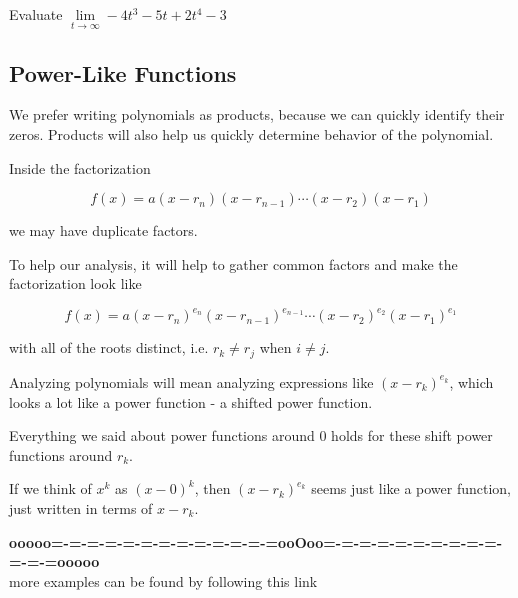 \documentclass{ximera}
\begin{document}
\begin{question}

Evaluate $\lim\limits_{t \to \infty} -4 t^3 - 5 t + 2 t^4  - 3$


\begin{multipleChoice}
\choice [correct]{$-\infty$}
\choice {$\infty$}
\end{multipleChoice}

\end{question}










\subsection{Power-Like Functions}

We prefer writing polynomials as products, because we can quickly identify their zeros.  Products will also help us quickly determine behavior of the polynomial.

Inside the factorization

\[   f(x) = a (x-r_n)(x-r_{n-1})  \cdots (x-r_2)(x-r_1)  \]

we may have duplicate factors.

To help our analysis, it will help to gather common factors and make the factorization look like

\[   f(x) = a (x-r_n)^{e_n}(x-r_{n-1})^{e_{n-1}}  \cdots (x-r_2)^{e_2}(x-r_1)^{e_1}  \]

with all of the roots distinct, i.e. $r_k \ne r_j$ when $i \ne j$.



Analyzing polynomials will mean analyzing expressions like $(x-r_k)^{e_k}$, which looks a lot like a power function - a shifted power function.

Everything we said about power functions around $0$ holds for these shift power functions around $r_k$. 


If we think of $x^k$ as $(x-0)^k$, then $(x-r_k)^{e_k}$ seems just like a power function, just written in terms of $x-r_k$.















\begin{center}
\textbf{\textcolor{green!50!black}{ooooo=-=-=-=-=-=-=-=-=-=-=-=-=ooOoo=-=-=-=-=-=-=-=-=-=-=-=-=ooooo}} \\

more examples can be found by following this link\\ 

\end{center}
\end{document}
